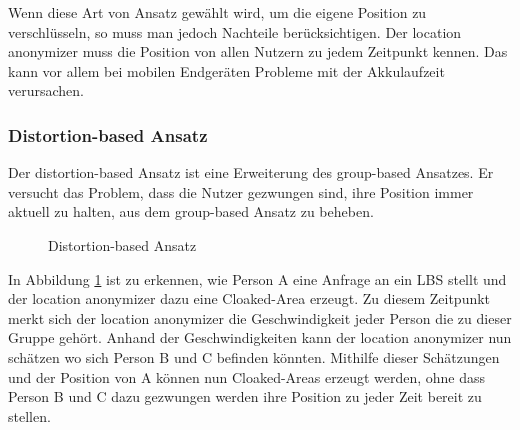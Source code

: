 Wenn diese Art von Ansatz gewählt wird, um die eigene Position zu verschlüsseln, so muss man jedoch Nachteile berücksichtigen. Der location anonymizer muss die Position von allen Nutzern zu jedem Zeitpunkt kennen. Das kann vor allem bei mobilen Endgeräten Probleme mit der Akkulaufzeit verursachen.  
\subsubsection{Distortion-based Ansatz} 
Der distortion-based Ansatz ist eine Erweiterung des group-based Ansatzes. Er versucht das Problem, dass die Nutzer gezwungen sind, ihre Position immer aktuell zu halten, aus dem group-based Ansatz zu beheben. 
\begin{figure}[!h]
		\centering
		\caption{Distortion-based Ansatz}
		\label{fig_chow2011_Distortion-Ansatz}
\end{figure}
In Abbildung \ref{fig_chow2011_Distortion-Ansatz} ist zu erkennen, wie Person A eine Anfrage an ein LBS stellt und der location anonymizer dazu eine Cloaked-Area erzeugt. Zu diesem Zeitpunkt merkt sich der location anonymizer die Geschwindigkeit jeder Person die zu dieser Gruppe gehört. Anhand der Geschwindigkeiten kann der location anonymizer nun schätzen wo sich Person B und C befinden könnten. Mithilfe dieser Schätzungen und der Position von A können nun Cloaked-Areas erzeugt werden, ohne dass Person B und C dazu gezwungen werden ihre Position zu jeder Zeit bereit zu stellen.
